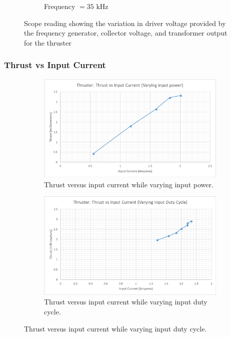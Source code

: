 \documentclass[11pt]{article}
\begin{document}
\begin{figure}[h!]
\begin{subfigure}{0.49\textwidth}
\caption{Frequency $= 35$ kHz}
\label{fig:thruster_sc_32}
\end{subfigure}
\caption{\label{fig:thruster_frequency} Scope reading showing the variation in driver voltage provided by the frequency generator, collector voltage, and transformer output for the thruster}
\end{figure}


\pagebreak
\subsubsection{Thrust vs Input Current}

\begin{figure}[h!]
\centering
\begin{subfigure}{0.49\textwidth}
\centering
\includegraphics[width = \textwidth]{thruster_c1}
\caption{\label{fig:thruster_c1} Thrust versus input current while varying input power.}
\end{subfigure}
\begin{subfigure}{0.49\textwidth}
\centering
\includegraphics[width = \textwidth]{thruster_c2}
\caption{\label{fig:thruster_c2} Thrust versus input current while varying input duty cycle.}

\end{subfigure}
\end{figure}
\end{document}
